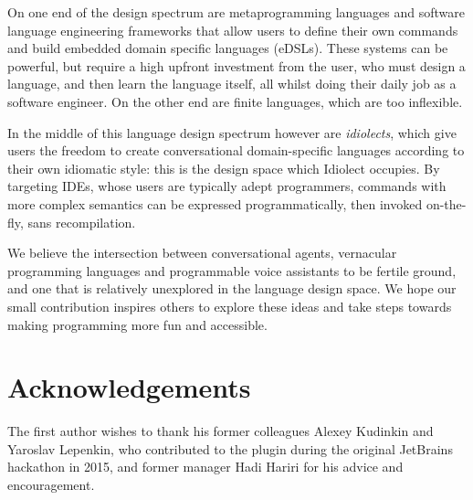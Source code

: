 \documentclass[conference]{IEEEtran}
\begin{document}
On one end of the design spectrum are metaprogramming languages and software language engineering frameworks that allow users to define their own commands and build embedded domain specific languages (eDSLs). These systems can be powerful, but require a high upfront investment from the user, who must design a language, and then learn the language itself, all whilst doing their daily job as a software engineer. On the other end are finite languages, which are too inflexible.

In the middle of this language design spectrum however are \textit{idiolects}, which give users the freedom to create conversational domain-specific languages according to their own idiomatic style: this is the design space which Idiolect occupies. By targeting IDEs, whose users are typically adept programmers, commands with more complex semantics can be expressed programmatically, then invoked on-the-fly, sans recompilation.

We believe the intersection between conversational agents, vernacular programming languages and programmable voice assistants to be fertile ground, and one that is relatively unexplored in the language design space. We hope our small contribution inspires others to explore these ideas and take steps towards making programming more fun and accessible.

\section{Acknowledgements}

The first author wishes to thank his former colleagues Alexey Kudinkin and Yaroslav Lepenkin, who contributed to the plugin during the original JetBrains hackathon in 2015, and former manager Hadi Hariri for his advice and encouragement.


\end{document}
